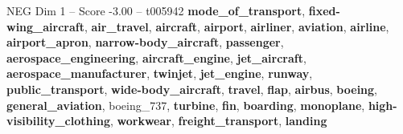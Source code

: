 \begin{textsample}{NEG Dim 1 – Score -3.00 – t005942}  \label{ex:f1_neg_028}
\textbf{mode\_of\_transport}, \textbf{fixed-wing\_aircraft}, \textbf{air\_travel}, \textbf{aircraft}, \textbf{airport}, \textbf{airliner}, \textbf{aviation}, \textbf{airline}, \textbf{airport\_apron}, \textbf{narrow-body\_aircraft}, \textbf{passenger}, \textbf{aerospace\_engineering}, \textbf{aircraft\_engine}, \textbf{jet\_aircraft}, \textbf{aerospace\_manufacturer}, \textbf{twinjet}, \textbf{jet\_engine}, \textbf{runway}, \textbf{public\_transport}, \textbf{wide-body\_aircraft}, \textbf{travel}, \textbf{flap}, \textbf{airbus}, \textbf{boeing}, \textbf{general\_aviation}, boeing\_737, \textbf{turbine}, \textbf{fin}, \textbf{boarding}, \textbf{monoplane}, \textbf{high-visibility\_clothing}, \textbf{workwear}, \textbf{freight\_transport}, \textbf{landing}

\end{textsample}
